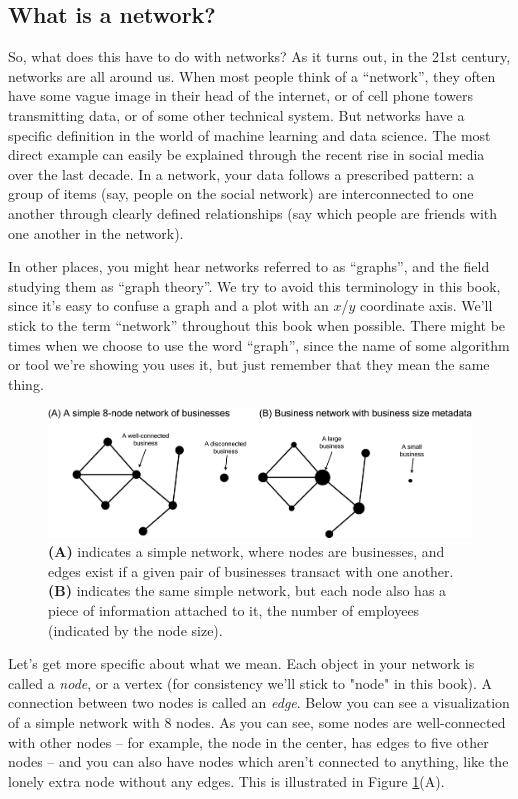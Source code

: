 \subsection{What is a network?}

So, what does this have to do with networks? As it turns out, in the 21st century, networks are all around us. When most people think of a ``network'', they often have some vague image in their head of the internet, or of cell phone towers transmitting data, or of some other technical system. But networks have a specific definition in the world of machine learning and data science. The most direct example can easily be explained through the recent rise in social media over the last decade. In a network, your data follows a prescribed pattern: a group of items (say, people on the social network) are interconnected to one another through clearly defined relationships (say which people are friends with one another in the network). 

In other places, you might hear networks referred to as ``graphs'', and the field studying them as ``graph theory''. We try to avoid this terminology in this book, since it's easy to confuse a graph and a plot with an $x$/$y$ coordinate axis. We'll stick to the term ``network'' throughout this book when possible. There might be times when we choose to use the word ``graph'', since the name of some algorithm or tool we're showing you uses it, but just remember that they mean the same thing.

\begin{figure}[h]
    \centering
    \includegraphics[width=\linewidth]{foundations/ch1/Images/simp_net.png}
    \caption[Simple network example]{\textbf{(A)} indicates a simple network, where nodes are businesses, and edges exist if a given pair of businesses transact with one another. \textbf{(B)} indicates the same simple network, but each node also has a piece of information attached to it, the number of employees (indicated by the node size).}
    \label{fig:ch1:simplenet}
\end{figure}

Let's get more specific about what we mean. Each object in your network is called a \textit{node}, or a vertex (for consistency we'll stick to "node" in this book). A connection between two nodes is called an \textit{edge}. Below you can see a visualization of a simple network with 8 nodes. As you can see, some nodes are well-connected with other nodes -- for example, the node in the center, has edges to five other nodes -- and you can also have nodes which aren't connected to anything, like the lonely extra node without any edges. This is illustrated in Figure \ref{fig:ch1:simplenet}(A).

